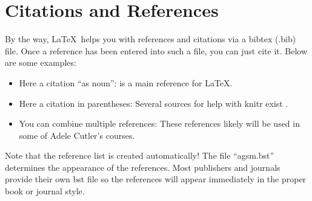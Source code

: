 \documentclass[12pt]{article}\usepackage[]{graphicx}\usepackage[]{xcolor}
\begin{document}
\section{Citations and References}

By the way, \LaTeX\ helps you with references and citations via
a bibtex (.bib) file. Once a reference has been entered into such a file,
you can just cite it. Below are some examples:

\begin{itemize}
\item Here a citation ``as noun'':
\cite{Lamport85} is a main reference for \LaTeX.

\item Here a citation in parentheses:
Several sources for help with knitr exist \citep{knitr2013}.

\item You can combine multiple references: These references
\citep{CART,bagging,RF} likely will be used in some of Adele Cutler's courses.
\end{itemize}

Note that the reference list is created automatically! The file ``agsm.bst''
determines the appearance of the references. Most publishers and journals
provide their own bst file so the references will appear immediately
in the proper book or journal style.






\end{document}
